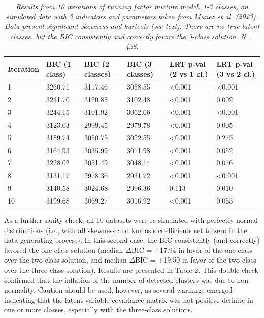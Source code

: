 \documentclass[letterpaper,11pt]{article}
\begin{document}
\begin{table}[htbp]
    \centering
    \label{tab:iterationResults}
    \caption{\newline \textit{Results from 10 iterations of running factor mixture model, 1-3 classes, on simulated data with 3 indicators and parameters taken from Munez et al. (2023). Data present significant skewness and kurtosis (see text). There are no true latent classes, but the BIC consistently and correctly favors the 3-class solution. N = 428.}}
    \begin{tabularx}{\textwidth}{XXXXXX}
       \toprule
        \textbf{Iteration} & \textbf{BIC \newline(1 class)} & \textbf{BIC \newline(2 classes)} & \textbf{BIC \newline(3 classes)} & \textbf{LRT p-val \newline(2 vs 1 cl.)} & \textbf{LRT p-val \newline(3 vs 2 cl.)}  \\
        \midrule
        1 & 3260.71 & 3117.46 & 3058.55 & \textless 0.001 & \textless 0.001 \\
        2 & 3231.70 & 3120.85 & 3102.48 & \textless 0.001 & 0.002 \\
        3 & 3244.15 & 3101.92 & 3062.66 & \textless 0.001 & \textless 0.001 \\
        4 & 3123.03 & 2999.45 & 2979.78 & \textless 0.001 & 0.005 \\
        5 & 3189.74 & 3050.75 & 3022.55 & \textless 0.001 & 0.275 \\
        6 & 3164.93 & 3035.99 & 3011.98 & \textless 0.001 & 0.052 \\
        7 & 3228.02 & 3051.49 & 3048.14 & \textless 0.001 & 0.076 \\
        8 & 3131.17 & 2978.36 & 2931.72 & \textless 0.001 & \textless 0.001 \\
        9 & 3140.58 & 3024.68 & 2996.36 & 0.113 & 0.010 \\
       10 & 3199.68 & 3069.27 & 3016.92 & \textless 0.001 & 0.055 \\
        \bottomrule
    \end{tabularx}
\end{table}

As a further sanity check, all 10 datasets were re-simulated with perfectly normal distributions (i.e., with all skewness and kurtosis coefficients set to zero in the data-generating process). In this second case, the BIC consistently (and correctly) favored the one-class solution (median $\Delta$BIC = +17.94 in favor of the one-class over the two-class solution, and median $\Delta$BIC = +19.50 in favor of the two-class over the three-class solution). Results are presented in Table 2. This double check confirmed that the inflation of the number of detected clusters was due to non-normality. Caution should be used, however, as several warnings emerged indicating that the latent variable covariance matrix was not positive definite in one or more classes, especially with the three-class solutions.
\end{document}
